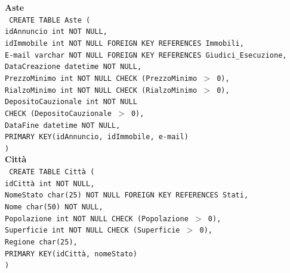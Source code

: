 \documentclass[a4paper,12pt]{report}
\begin{document}
                \noindent
                {\large \textbf{Aste}} \\
                \texttt{
                    CREATE TABLE Aste ( \\
                    \null\quad\quad idAnnuncio          int         NOT NULL, \\
                    \null\quad\quad idImmobile int NOT NULL FOREIGN KEY REFERENCES Immobili, \\
                    \null\quad\quad E-mail varchar NOT NULL FOREIGN KEY REFERENCES Giudici\_Esecuzione, \\
                    \null\quad\quad DataCreazione       datetime    NOT NULL, \\
                    \null\quad\quad PrezzoMinimo        int         NOT NULL CHECK (PrezzoMinimo $>$ 0), \\
                    \null\quad\quad RialzoMinimo        int         NOT NULL CHECK (RialzoMinimo $>$ 0), \\
                    \null\quad\quad DepositoCauzionale  int         NOT NULL \\
                            \null\qquad\qquad CHECK (DepositoCauzionale $>$ 0), \\
                    \null\quad\quad DataFine            datetime    NOT NULL, \\
                    \null\quad\quad PRIMARY KEY(idAnnuncio, idImmobile, e-mail) \\
                    )
                } \\

                \noindent
                {\large \textbf{Città}} \\
                \texttt{
                    CREATE TABLE Città ( \\
                    \null\quad\quad idCittà         int         NOT NULL, \\
                    \null\quad\quad NomeStato char(25) NOT NULL FOREIGN KEY REFERENCES Stati, \\
                    \null\quad\quad Nome            char(50)    NOT NULL, \\
                    \null\quad\quad Popolazione     int         NOT NULL CHECK (Popolazione $>$ 0), \\
                    \null\quad\quad Superficie      int         NOT NULL CHECK (Superficie $>$ 0), \\
                    \null\quad\quad Regione         char(25), \\
                    \null\quad\quad PRIMARY KEY(idCittà, nomeStato) \\
                    )
                } \\
\end{document}
